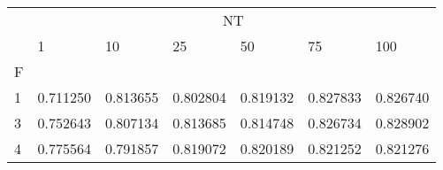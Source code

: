 \begin{table}[htbp]
\centering
\label{heart-results}
\begin{tabular}{lllllll}
\toprule
 & \multicolumn{6}{c}{NT} \\
 & 1 & 10 & 25 & 50 & 75 & 100 \\
F &  &  &  &  &  &  \\
\midrule
1 & 0.711250 & 0.813655 & 0.802804 & 0.819132 & 0.827833 & 0.826740 \\
3 & 0.752643 & 0.807134 & 0.813685 & 0.814748 & 0.826734 & 0.828902 \\
4 & 0.775564 & 0.791857 & 0.819072 & 0.820189 & 0.821252 & 0.821276 \\
\bottomrule
\end{tabular}
\end{table}
